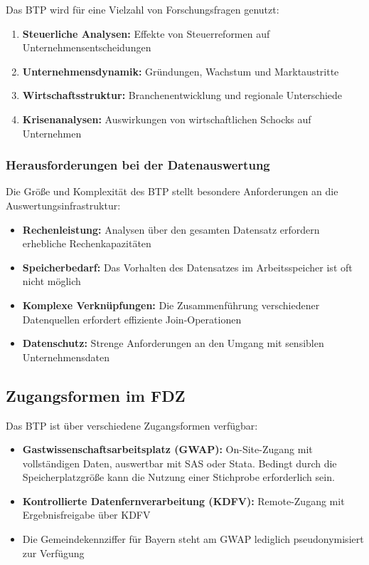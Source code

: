\documentclass[
  ngerman,
  10pt,
  twocolumn]{article}
\providecommand{\tightlist}{%
  \setlength{\itemsep}{0pt}\setlength{\parskip}{0pt}}
\begin{document}
Das BTP wird für eine Vielzahl von Forschungsfragen genutzt:

\begin{enumerate}
\def\labelenumi{\arabic{enumi}.}
\tightlist
\item
  \textbf{Steuerliche Analysen:} Effekte von Steuerreformen auf
  Unternehmensentscheidungen
\item
  \textbf{Unternehmensdynamik:} Gründungen, Wachstum und Marktaustritte
\item
  \textbf{Wirtschaftsstruktur:} Branchenentwicklung und regionale
  Unterschiede
\item
  \textbf{Krisenanalysen:} Auswirkungen von wirtschaftlichen Schocks auf
  Unternehmen
\end{enumerate}

\subsubsection{Herausforderungen bei der
Datenauswertung}\label{herausforderungen-bei-der-datenauswertung}

Die Größe und Komplexität des BTP stellt besondere Anforderungen an die
Auswertungsinfrastruktur:

\begin{itemize}
\tightlist
\item
  \textbf{Rechenleistung:} Analysen über den gesamten Datensatz
  erfordern erhebliche Rechenkapazitäten
\item
  \textbf{Speicherbedarf:} Das Vorhalten des Datensatzes im
  Arbeitsspeicher ist oft nicht möglich
\item
  \textbf{Komplexe Verknüpfungen:} Die Zusammenführung verschiedener
  Datenquellen erfordert effiziente Join-Operationen
\item
  \textbf{Datenschutz:} Strenge Anforderungen an den Umgang mit
  sensiblen Unternehmensdaten
\end{itemize}

\subsection{Zugangsformen im FDZ}\label{zugangsformen-im-fdz}

Das BTP ist über verschiedene Zugangsformen verfügbar:

\begin{itemize}
\tightlist
\item
  \textbf{Gastwissenschaftsarbeitsplatz (GWAP):} On-Site-Zugang mit
  vollständigen Daten, auswertbar mit SAS oder Stata. Bedingt durch die
  Speicherplatzgröße kann die Nutzung einer Stichprobe erforderlich
  sein.
\item
  \textbf{Kontrollierte Datenfernverarbeitung (KDFV):} Remote-Zugang mit
  Ergebnisfreigabe über KDFV
\item
  Die Gemeindekennziffer für Bayern steht am GWAP lediglich
  pseudonymisiert zur Verfügung
\end{itemize}
\end{document}
